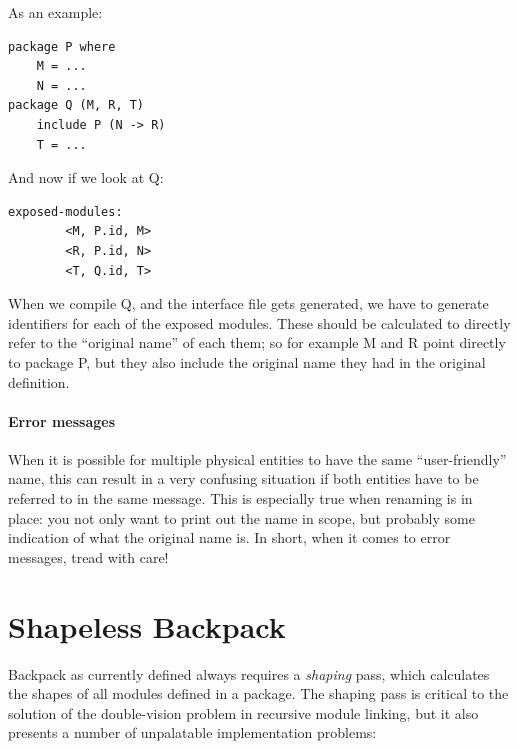 \documentclass{article}
\begin{document}
As an example:

\begin{verbatim}
package P where
    M = ...
    N = ...
package Q (M, R, T)
    include P (N -> R)
    T = ...
\end{verbatim}

And now if we look at Q\@:

\begin{verbatim}
exposed-modules:
        <M, P.id, M>
        <R, P.id, N>
        <T, Q.id, T>
\end{verbatim}

When we compile Q, and the interface file gets generated, we have
to generate identifiers for each of the exposed modules.  These should
be calculated to directly refer to the ``original name'' of each them;
so for example M and R point directly to package P, but they also
include the original name they had in the original definition.

\paragraph{Error messages}  When it is possible for multiple physical
entities to have the same ``user-friendly'' name, this can result in a
very confusing situation if both entities have to be referred to in the
same message.  This is especially true when renaming is in place:
you not only want to print out the name in scope, but probably some indication
of what the original name is.  In short, when it comes to error messages, tread with care!

\section{Shapeless Backpack}\label{sec:simplifying-backpack}

Backpack as currently defined always requires a \emph{shaping} pass,
which calculates the shapes of all modules defined in a package.
The shaping pass is critical to the solution of the double-vision problem
in recursive module linking, but it also presents a number of unpalatable
implementation problems:
\end{document}
